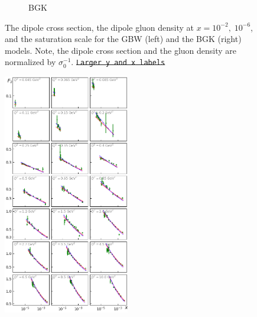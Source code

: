 \documentclass[11pt]{article}
\numberwithin{equation}{section}
\numberwithin{table}{section}
\numberwithin{figure}{section}
\newcommand{\comment}[1]{\texttt{\color{red}#1}}
\begin{document}
\begin{figure}[p]
\begin{multicols}{2}
\begin{subfigure}{0.5\textwidth}
    \caption{BGK}
    \label{fig:BGK}
\end{subfigure}
  \end{multicols}
  \caption{The dipole cross section, the dipole gluon density at $x=10^{-2},\;
  10^{-6}$, and the saturation scale for the GBW (left) and the BGK (right)
  models. Note, the dipole cross section and the gluon density are normalized by
  $\sigma_0^{-1}$. \sout{\comment{Larger y and x labels}}} 
\label{fig:GBW-BGK}
\end{figure}

\begin{figure}[p]
\includegraphics[width=0.49\textwidth,height=1.0\textwidth]{./plots/Figure_1.png}

\end{figure}
\end{document}
